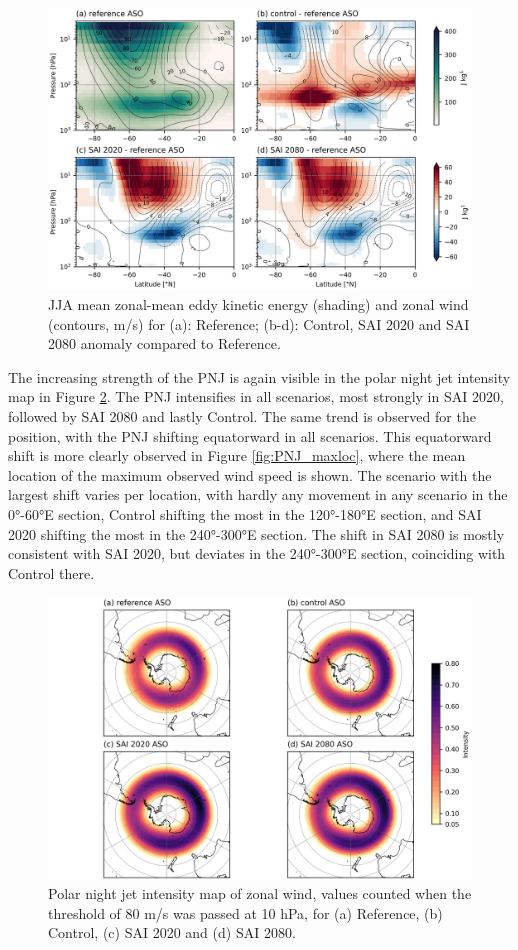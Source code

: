 \begin{figure}[H]
	\centering
	\includegraphics[width=0.95\linewidth]{images/PNJ_EKE_U_zmdiff.png}
	\caption{JJA mean zonal-mean eddy kinetic energy (shading) and zonal wind (contours, m/s) for (a): Reference; (b-d): Control, SAI 2020 and SAI 2080 anomaly compared to Reference.}
	\label{fig:PNJ_EKE_U_zmdiff}
\end{figure}

The increasing strength of the PNJ is again visible in the polar night jet intensity map in Figure \ref{fig:PNJ_map}. The PNJ intensifies in all scenarios, most strongly in SAI 2020, followed by SAI 2080 and lastly Control. The same trend is observed for the position, with the PNJ shifting equatorward in all scenarios. This equatorward shift is more clearly observed in Figure \ref{fig:PNJ_maxloc}, where the mean location of the maximum observed wind speed is shown. The scenario with the largest shift varies per location, with hardly any movement in any scenario in the 0°-60°E section, Control shifting the most in the 120°-180°E section, and SAI 2020 shifting the most in the 240°-300°E section. The shift in SAI 2080 is mostly consistent with SAI 2020, but deviates in the 240°-300°E section, coinciding with Control there.

\begin{figure}[H]
	\centering
	\includegraphics[width=0.95\linewidth]{images/PNJ_map.png}
	\caption{Polar night jet intensity map of zonal wind, values counted when the threshold of 80 m/s was passed at 10 hPa, for (a) Reference, (b) Control, (c) SAI 2020 and (d) SAI 2080.}
	\label{fig:PNJ_map}
\end{figure}


